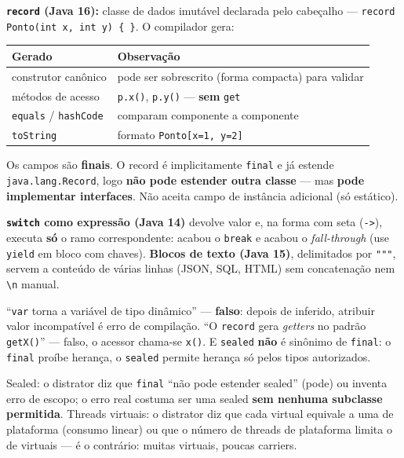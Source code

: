 \textbf{\texttt{record} (Java 16):} classe de dados imutável declarada pelo
cabeçalho --- \texttt{record Ponto(int x, int y) \{ \}}. O compilador gera:

\begin{center}
\begin{tabular}{@{}p{3.6cm}p{7.4cm}@{}}
\toprule
\textbf{Gerado} & \textbf{Observação} \\
\midrule
construtor canônico & pode ser sobrescrito (forma compacta) para validar \\
métodos de acesso & \texttt{p.x()}, \texttt{p.y()} --- \textbf{sem} \texttt{get} \\
\texttt{equals} / \texttt{hashCode} & comparam componente a componente \\
\texttt{toString} & formato \texttt{Ponto[x=1, y=2]} \\
\bottomrule
\end{tabular}
\end{center}

Os campos são \textbf{finais}. O record é implicitamente \texttt{final} e já
estende \texttt{java.lang.Record}, logo \textbf{não pode estender outra
classe} --- mas \textbf{pode implementar interfaces}. Não aceita campo de
instância adicional (só estático).

\textbf{\texttt{switch} como expressão (Java 14)} devolve valor e, na forma
com seta (\texttt{->}), executa \textbf{só} o ramo correspondente: acabou o
\texttt{break} e acabou o \textit{fall-through} (use \texttt{yield} em bloco
com chaves). \textbf{Blocos de texto (Java 15)}, delimitados por
\texttt{"""}, servem a conteúdo de várias linhas (JSON, SQL, HTML) sem
concatenação nem \texttt{\textbackslash n} manual.

\begin{pegadinha}
``\texttt{var} torna a variável de tipo dinâmico'' --- \textbf{falso}:
depois de inferido, atribuir valor incompatível é erro de compilação.
``O \texttt{record} gera \emph{getters} no padrão \texttt{getX()}'' ---
falso, o acessor chama-se \texttt{x()}. E \texttt{sealed} \textbf{não} é
sinônimo de \texttt{final}: o \texttt{final} proíbe herança, o
\texttt{sealed} permite herança só pelos tipos autorizados.
\end{pegadinha}

\begin{pegadinha}
Sealed: o distrator diz que \texttt{final} ``não pode estender sealed''
(pode) ou inventa erro de escopo; o erro real costuma ser uma sealed
\textbf{sem nenhuma subclasse permitida}. Threads virtuais: o distrator diz
que cada virtual equivale a uma de plataforma (consumo linear) ou que o
número de threads de plataforma limita o de virtuais --- é o contrário:
muitas virtuais, poucas carriers.
\end{pegadinha}

